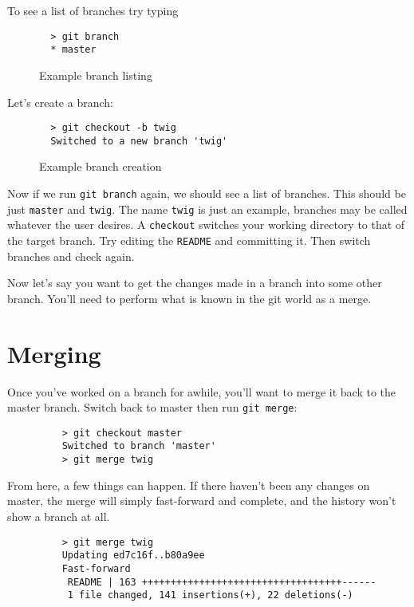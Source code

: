 \documentclass[11pt]{report}
\begin{document}
To see a list of branches try typing 
\begin{figure}[H]
  \caption{Example branch listing}
  \begin{lstlisting}
  > git branch
  * master
  \end{lstlisting}
 \end{figure}

Let's create a branch:

\begin{figure}[H]
  \caption{Example branch creation}
  \begin{lstlisting}
  > git checkout -b twig
  Switched to a new branch 'twig'
  \end{lstlisting}
\end{figure}

Now if we run \texttt{git branch} again, we should see a list of
branches. This should be just \texttt{master} and \texttt{twig}.
The name \texttt{twig} is just an example, branches may be called
whatever the user desires. A \texttt{checkout} switches your working
directory to that of the target branch. Try editing the \texttt{README}
and committing it. Then switch branches and check again.

Now let's say you want to get the changes made in a branch into some other
branch. You'll need to perform what is known in the git world as a
merge.

\section{Merging}

Once you've worked on a branch for awhile, you'll want to merge it
back to the master branch. Switch back to master then run
\texttt{git merge}:

\begin{figure}[H]
  \begin{lstlisting}
    > git checkout master
    Switched to branch 'master'
    > git merge twig
  \end{lstlisting}
\end{figure}

From here, a few things can happen. If there haven't been any changes
on master, the merge will simply fast-forward and complete, and the
history won't show a branch at all.

\begin{figure}[H]
  \begin{lstlisting}
    > git merge twig
    Updating ed7c16f..b80a9ee
    Fast-forward
     README | 163 +++++++++++++++++++++++++++++++++++------
     1 file changed, 141 insertions(+), 22 deletions(-)
  \end{lstlisting}
\end{figure}
\end{document}
